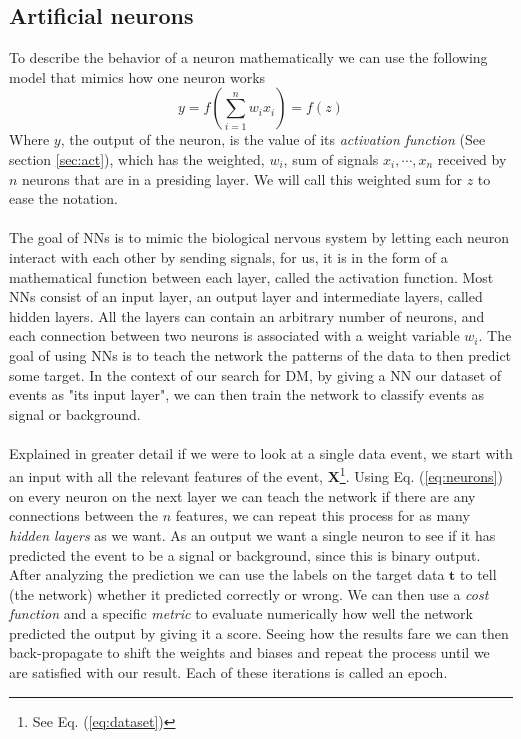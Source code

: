 \documentclass[12pt, a4paper]{book}
\begin{document}
\subsection{Artificial neurons}\label{sec:neurons}
To describe the behavior of a neuron mathematically we can use the following model that mimics how one neuron works
\begin{equation}\label{eq:neurons}
    y=f\left(\sum_{i=1}^{n}w_ix_i\right)=f(z)
\end{equation}
Where $y$, the output of the neuron, is the value of its \textit{activation function} (See section \ref{sec:act}), which has the weighted, $w_i$, sum of signals $x_i,\cdots,x_n$ received by $n$ neurons that are in a presiding layer. We will call this weighted sum for $z$ to ease the notation.\\
\\The goal of NNs is to mimic the biological nervous system by letting each neuron interact with each other by sending signals, for us, it is in the form of a mathematical function between each layer, called the activation function. 
Most NNs consist of an input layer, an output layer and intermediate layers, called hidden layers. All the layers can contain an arbitrary number of neurons, and each connection between two neurons is associated with a weight variable $w_i$.
The goal of using NNs is to teach the network the patterns of the data to then predict some target. In the context of our search for DM, by giving a NN our dataset of events as "its input layer", we can then train the network to classify events as signal or background.\\
\\Explained in greater detail if we were to look at a single data event, we start with an input with all the relevant features of the event, $\bm X$\footnote{See Eq. (\ref{eq:dataset})}. Using Eq. (\ref{eq:neurons}) on every neuron on the next layer we can teach the network if there 
are any connections between the $n$ features, we can repeat this process for as many \textit{hidden layers} as we want. As an output we want a single neuron to see if it has predicted the event to be a signal or background, since this is binary output. After analyzing the prediction we can use the labels on the target data $\bm t$ 
to tell (the network) whether it predicted correctly or wrong. We can then use a \textit{cost function} and a specific \textit{metric} to evaluate numerically how well the network predicted the output by giving it a score. 
Seeing how the results fare we can then back-propagate to shift the weights and biases and repeat the process until we are satisfied with our result. Each of these iterations is called an epoch.\\
\end{document}

